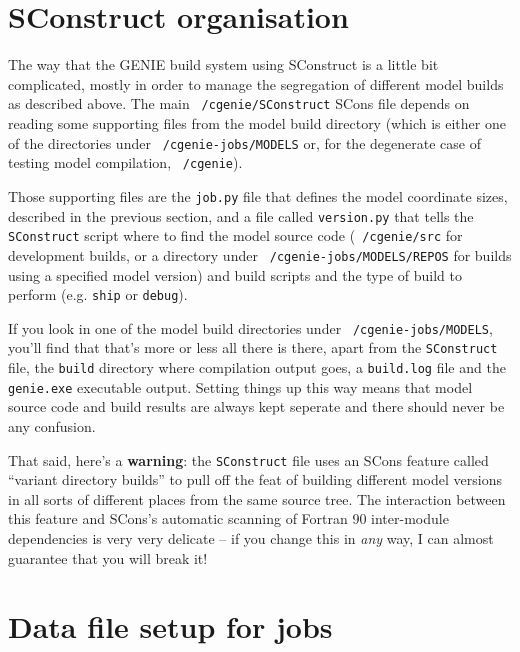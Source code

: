 \documentclass[a4paper,10pt,article]{memoir}
\begin{document}
\section{SConstruct organisation}

The way that the GENIE build system using SConstruct is a little bit
complicated, mostly in order to manage the segregation of different
model builds as described above.  The main
\texttt{~/cgenie/SConstruct} SCons file depends on reading some
supporting files from the model build directory (which is either one
of the directories under \texttt{~/cgenie-jobs/MODELS} or, for the
degenerate case of testing model compilation, \texttt{~/cgenie}).

Those supporting files are the \texttt{job.py} file that defines the
model coordinate sizes, described in the previous section, and a file
called \texttt{version.py} that tells the \texttt{SConstruct} script
where to find the model source code (\texttt{~/cgenie/src} for
development builds, or a directory under
\texttt{~/cgenie-jobs/MODELS/REPOS} for builds using a specified model
version) and build scripts and the type of build to perform
(e.g. \texttt{ship} or \texttt{debug}).

If you look in one of the model build directories under
\texttt{~/cgenie-jobs/MODELS}, you'll find that that's more or less
all there is there, apart from the \texttt{SConstruct} file, the
\texttt{build} directory where compilation output goes, a
\texttt{build.log} file and the \texttt{genie.exe} executable output.
Setting things up this way means that model source code and build
results are always kept seperate and there should never be any
confusion.

That said, here's a \textbf{warning}: the \texttt{SConstruct} file
uses an SCons feature called ``variant directory builds'' to pull off
the feat of building different model versions in all sorts of
different places from the same source tree.  The interaction between
this feature and SCons's automatic scanning of Fortran 90 inter-module
dependencies is very very delicate -- if you change this in \emph{any}
way, I can almost guarantee that you will break it!

\section{Data file setup for jobs}
\end{document}
